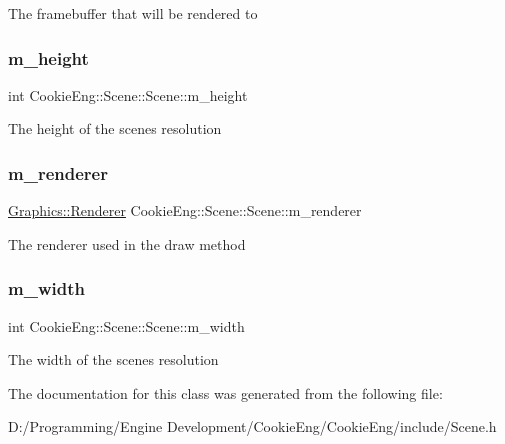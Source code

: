 The framebuffer that will be rendered to \mbox{\label{class_cookie_eng_1_1_scene_1_1_scene_aea87f5d089b50a248e01ae281441edd3}} 
\subsubsection{\texorpdfstring{m\+\_\+height}{m\_height}}
{\footnotesize\ttfamily int Cookie\+Eng\+::\+Scene\+::\+Scene\+::m\+\_\+height\hspace{0.3cm}{\ttfamily [protected]}}

The height of the scene\textquotesingle{}s resolution \mbox{\label{class_cookie_eng_1_1_scene_1_1_scene_aff47a056f32060d1180ae9bd379e9578}} 
\subsubsection{\texorpdfstring{m\+\_\+renderer}{m\_renderer}}
{\footnotesize\ttfamily \hyperlink{class_cookie_eng_1_1_graphics_1_1_renderer}{Graphics\+::\+Renderer} Cookie\+Eng\+::\+Scene\+::\+Scene\+::m\+\_\+renderer\hspace{0.3cm}{\ttfamily [protected]}}

The renderer used in the draw method \mbox{\label{class_cookie_eng_1_1_scene_1_1_scene_a1990da3f0d067d2b542aa6b8fc6f0d43}} 
\subsubsection{\texorpdfstring{m\+\_\+width}{m\_width}}
{\footnotesize\ttfamily int Cookie\+Eng\+::\+Scene\+::\+Scene\+::m\+\_\+width\hspace{0.3cm}{\ttfamily [protected]}}

The width of the scene\textquotesingle{}s resolution 

The documentation for this class was generated from the following file\+:\begin{DoxyCompactItemize}
\item 
D\+:/\+Programming/\+Engine Development/\+Cookie\+Eng/\+Cookie\+Eng/include/Scene.\+h\end{DoxyCompactItemize}
